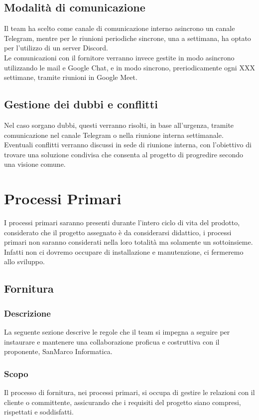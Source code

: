 \subsection{Modalità di comunicazione}
    Il team ha scelto come canale di comunicazione interno asincrono un canale Telegram,
    mentre per le riunioni periodiche sincrone, una a settimana, ha optato per 
    l'utilizzo di un server Discord.\\
    Le comunicazioni con il fornitore verranno invece gestite in modo asincrono 
    utilizzando le mail e Google Chat, e in modo sincrono, preriodicamente ogni 
    XXX settimane, tramite riunioni in Google Meet.

\subsection{Gestione dei dubbi e conflitti}
    Nel caso sorgano dubbi, questi verranno risolti, in base all’urgenza, 
    tramite comunicazione nel canale Telegram o nella riunione interna 
    settimanale. \\Eventuali conflitti verranno discussi in sede di riunione 
    interna, con l’obiettivo di trovare una soluzione condivisa che consenta 
    al progetto di progredire secondo una visione comune.

\newpage

\section{Processi Primari}
I processi primari saranno presenti durante l'intero ciclo di vita del prodotto, 
considerato che il progetto assegnato è da considerarsi didattico, i processi 
primari non saranno considerati nella loro totalità ma solamente un sottoinsieme.\\
Infatti non ci dovremo occupare di installazione e manutenzione, ci fermeremo allo sviluppo.

\subsection{Fornitura}
\subsubsection{Descrizione}
La seguente sezione descrive le regole che il team si impegna a seguire 
per instaurare e mantenere una collaborazione proficua e costruttiva con il proponente, 
SanMarco Informatica.
\subsubsection{Scopo}
Il processo di fornitura, nei processi primari, si occupa di gestire le relazioni 
con il cliente o committente, assicurando che i requisiti del progetto siano 
compresi, rispettati e soddisfatti.

